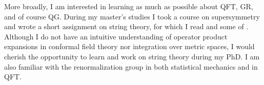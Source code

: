 \documentclass[a4paper,12pt]{article}
\begin{document}
More broadly, I am interested in learning as much as possible about QFT, GR, and of course QG. During my master’s studies I took a course on supersymmetry and wrote a short assignment on string theory, for which I read \textcite{Zwiebach_2009} and some of \textcite{Polchinski_1998}. Although I do not have an intuitive understanding of operator product expansions in conformal field theory nor integration over metric spaces, I would cherish the opportunity to learn and work on string theory during my PhD. I am also familiar with the renormalization group in both statistical mechanics and in QFT.



%
\printbibliography%
\end{document}
